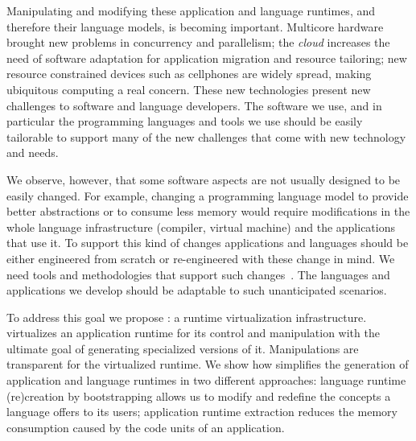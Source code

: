 Manipulating and modifying these application and language runtimes, and therefore their language models, is becoming important. Multicore hardware brought new problems in concurrency and parallelism; the \emph{cloud} increases the need of software adaptation for application migration and resource tailoring; new resource constrained devices such as cellphones are widely spread, making ubiquitous computing a real concern. These new technologies present new challenges to software and language developers. The software we use, and in particular the programming languages and tools we use should be easily tailorable to support many of the new challenges that come with new technology and needs.

We observe, however, that some software aspects are not usually designed to be easily changed. For example, changing a programming language model to provide better abstractions or to consume less memory would require modifications in the whole language infrastructure (\eg compiler, virtual machine) and the applications that use it. To support this kind of changes applications and languages should be either engineered from scratch or re-engineered with these change in mind. We need tools and methodologies that support such changes~\cite{Nier08b}. The languages and applications we develop should be adaptable to such unanticipated scenarios.

To address this goal we propose \emph{\Vtt}: a runtime virtualization infrastructure. \Vtt virtualizes an application runtime for its control and manipulation with the ultimate goal of generating specialized versions of it. Manipulations are transparent for the virtualized runtime. We show how \Vtt simplifies the generation of application and language runtimes in two different approaches: language runtime (re)creation by bootstrapping allows us to modify and redefine the concepts a language offers to its users; application runtime extraction reduces the memory consumption caused by the code units of an application.

